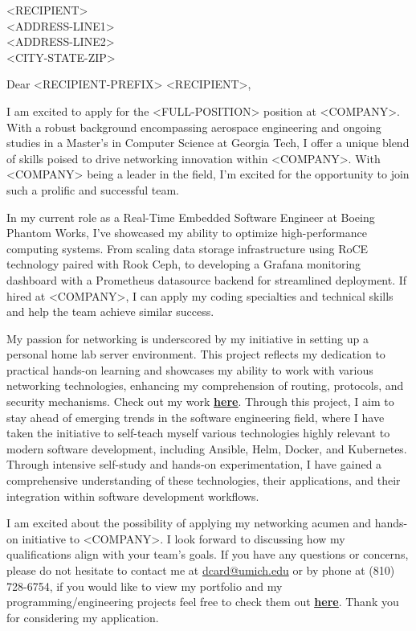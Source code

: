 \large
\bigskip\begin{minipage}[h]{\linewidth}
    \begin{raggedright}
        <RECIPIENT>\\
        <ADDRESS-LINE1>\\
        <ADDRESS-LINE2>\\
        <CITY-STATE-ZIP>\\
    \end{raggedright}
\end{minipage}

\bigskip Dear <RECIPIENT-PREFIX> <RECIPIENT>,

\medskip I am excited to apply for the <FULL-POSITION> position at <COMPANY>. With a robust background encompassing aerospace engineering and ongoing studies in a Master's in Computer Science at Georgia Tech, I offer a unique blend of skills poised to drive networking innovation within <COMPANY>. With <COMPANY> being a leader in the field, I'm excited for the opportunity to join such a prolific and successful team.

\medskip In my current role as a Real-Time Embedded Software Engineer at Boeing Phantom Works, I've showcased my ability to optimize high-performance computing systems. From scaling data storage infrastructure using RoCE technology paired with Rook Ceph, to developing a Grafana monitoring dashboard with a Prometheus datasource backend for streamlined deployment. If hired at <COMPANY>, I can apply my coding specialties and technical skills and help the team achieve similar success.

\medskip My passion for networking is underscored by my initiative in setting up a personal home lab server environment. This project reflects my dedication to practical hands-on learning and showcases my ability to work with various networking technologies, enhancing my comprehension of routing, protocols, and security mechanisms. Check out my work \href{https://github.com/dancard32/homelab}{\textbf{\underline{here}}}. Through this project, I aim to stay ahead of emerging trends in the software engineering field, where I have taken the initiative to self-teach myself various technologies highly relevant to modern software development, including Ansible, Helm, Docker, and Kubernetes. Through intensive self-study and hands-on experimentation, I have gained a comprehensive understanding of these technologies, their applications, and their integration within software development workflows.

\medskip I am excited about the possibility of applying my networking acumen and hands-on initiative to <COMPANY>. I look forward to discussing how my qualifications align with your team's goals. If you have any questions or concerns, please do not hesitate to contact me at \href{mailto:dcard@umich.edu}{dcard@umich.edu} or by phone at (810) 728-6754, if you would like to view my portfolio and my programming/engineering projects feel free to check them out \href{https://dancard32.github.io/website/#/projects}{\textbf{\underline{here}}}. Thank you for considering my application.


